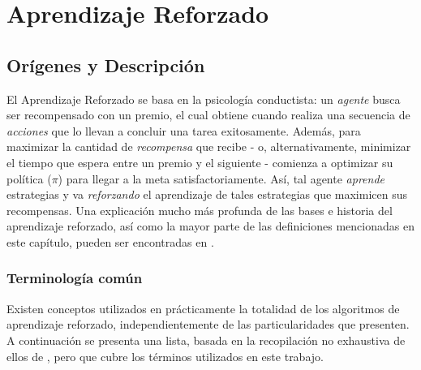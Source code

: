 \chapter{Aprendizaje Reforzado}

\section{Or\'igenes y Descripci\'on}

El Aprendizaje Reforzado se basa en la psicolog\'ia conductista: un \textit{agente} busca ser recompensado con un premio, el cual obtiene cuando realiza una secuencia de \textit{acciones} que lo llevan a concluir una tarea exitosamente. Adem\'as, para maximizar la cantidad de \textit{recompensa} que recibe - o, alternativamente, minimizar el tiempo que espera entre un premio y el siguiente - comienza a optimizar su pol\'itica (\textit{$\pi$}) para llegar a la meta satisfactoriamente. As\'i, tal agente \textit{aprende} estrategias y va \textit{reforzando} el aprendizaje de tales estrategias que maximicen sus recompensas. Una explicaci\'on mucho m\'as profunda de las bases e historia del aprendizaje reforzado, as\'i como la mayor parte de las definiciones mencionadas en este cap\'itulo, pueden ser encontradas en \citet{Sutton}.\\

\subsection{Terminolog\'ia com\'un}

Existen conceptos utilizados en pr\'acticamente la totalidad de los algoritmos de aprendizaje reforzado, independientemente de las particularidades que presenten. A continuaci\'on se presenta una lista, basada en la recopilaci\'on no exhaustiva de ellos de \citet{rlexplained}, pero que cubre los t\'erminos utilizados en este trabajo.

